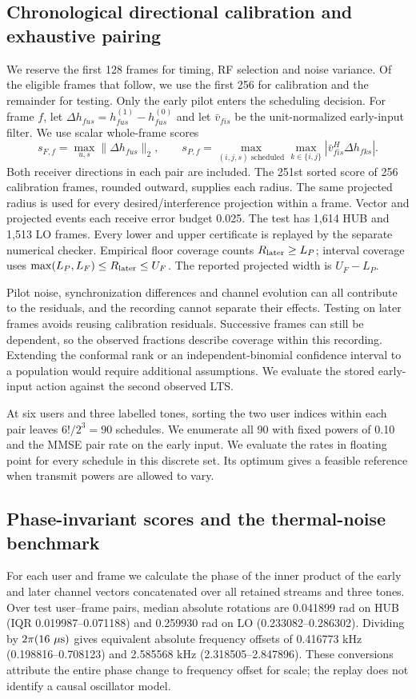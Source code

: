 \subsection*{Chronological directional calibration and exhaustive pairing}
We reserve the first 128 frames for timing, RF selection and noise variance. Of the eligible frames that follow, we use the first 256 for calibration and the remainder for testing. Only the early pilot enters the scheduling decision. For frame $f$, let $\Delta h_{fus}=h^{(1)}_{fus}-h^{(0)}_{fus}$ and let $\bar v_{fis}$ be the unit-normalized early-input filter. We use scalar whole-frame scores
\[
 s_{F,f}=\max_{u,s}\|\Delta h_{fus}\|_2,\qquad
 s_{P,f}=\max_{(i,j,s)\text{ scheduled}}\max_{k\in\{i,j\}}
 |\bar v_{fis}^{H}\Delta h_{fks}|.
\]
Both receiver directions in each pair are included. The 251st sorted score of 256 calibration frames, rounded outward, supplies each radius. The same projected radius is used for every desired/interference projection within a frame. Vector and projected events each receive error budget 0.025. The test has 1,614 HUB and 1,513 LO frames. Every lower and upper certificate is replayed by the separate numerical checker. Empirical floor coverage counts $R_{\rm later}\geq L_P$; interval coverage uses $\max(L_P,L_F)\leq R_{\rm later}\leq U_F$. The reported projected width is $U_F-L_P$.

Pilot noise, synchronization differences and channel evolution can all contribute to the residuals, and the recording cannot separate their effects. Testing on later frames avoids reusing calibration residuals. Successive frames can still be dependent, so the observed fractions describe coverage within this recording. Extending the conformal rank or an independent-binomial confidence interval to a population would require additional assumptions. We evaluate the stored early-input action against the second observed LTS.

At six users and three labelled tones, sorting the two user indices within each pair leaves $6!/2^3=90$ schedules. We enumerate all 90 with fixed powers of 0.10 and the MMSE pair rate on the early input. We evaluate the rates in floating point for every schedule in this discrete set. Its optimum gives a feasible reference when transmit powers are allowed to vary.


\subsection*{Phase-invariant scores and the thermal-noise benchmark}
For each user and frame we calculate the phase of the inner product of the early and later channel vectors concatenated over all retained streams and three tones. Over test user--frame pairs, median absolute rotations are 0.041899 rad on HUB (IQR 0.019987--0.071188) and 0.259930 rad on LO (0.233082--0.286302). Dividing by \(2\pi(16~\mu{\rm s})\) gives equivalent absolute frequency offsets of 0.416773 kHz (0.198816--0.708123) and 2.585568 kHz (2.318505--2.847896). These conversions attribute the entire phase change to frequency offset for scale; the replay does not identify a causal oscillator model.

